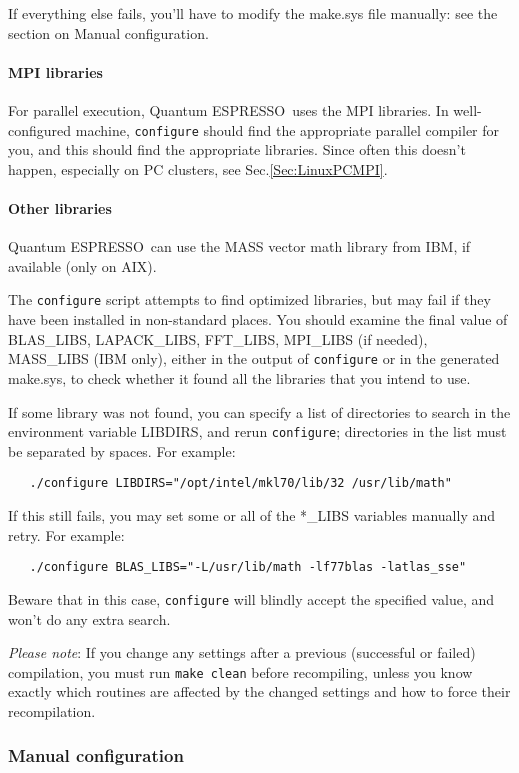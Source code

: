 \documentclass[12pt,a4paper]{article}
\def\qe{{\sc Quantum ESPRESSO}}
\begin{document}
If everything else fails, you'll have to modify the make.sys file
manually: see the section on Manual configuration. 

\paragraph{MPI libraries} 
For parallel execution, \qe\ uses the MPI libraries.
In well-configured machine, \texttt{configure} should find the appropriate
parallel compiler for you, and this should find the appropriate
libraries. Since often this doesn't 
happen, especially on PC clusters, see Sec.\ref{Sec:LinuxPCMPI}.

\paragraph{Other libraries}
\qe\ can use the MASS vector math
library from IBM, if available (only on AIX).
    
The \texttt{configure} script attempts to find optimized libraries, but may fail
if they have been installed in non-standard places. You should examine
the final value of BLAS\_LIBS, LAPACK\_LIBS, FFT\_LIBS, MPI\_LIBS (if needed),
MASS\_LIBS (IBM only), either in the output of \texttt{configure} or in the generated
make.sys, to check whether it found all the libraries that you intend to use.
    
If some library was not found, you can specify a list of directories to search
in the environment variable LIBDIRS, and rerun \texttt{configure}; directories in the
list must be separated by spaces. For example:
\begin{verbatim}
   ./configure LIBDIRS="/opt/intel/mkl70/lib/32 /usr/lib/math"
\end{verbatim}
If this still fails, you may set some or all of the *\_LIBS variables manually
and retry. For example:
\begin{verbatim}
   ./configure BLAS_LIBS="-L/usr/lib/math -lf77blas -latlas_sse"
\end{verbatim}
Beware that in this case, \texttt{configure} will blindly accept the specified value,
and won't do any extra search. 
    
{\em Please note}: If you change any settings after a previous (successful or
failed) compilation, you must run \texttt{make clean} before recompiling, 
unless you
know exactly which routines are affected by the changed settings and how to
force their recompilation.

\subsubsection{Manual configuration}
\end{document}
